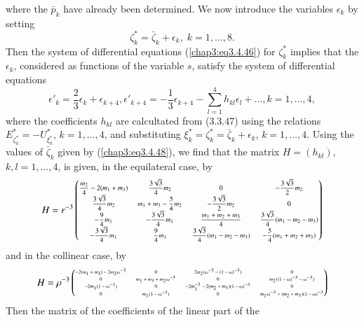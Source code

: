 where the $\bar{p}_k$ have already been determined. We now introduce
the variables $\epsilon_k$ by setting 
\begin{equation*}
\zeta^*_k = \bar{\zeta}_k + \epsilon_k, \; k =1, \ldots,
8. \tag{3.4.49}\label{chap3:eq3.4.49} 
\end{equation*}
Then the system of differential equations (\ref{chap3:eq3.4.46}) for
$\zeta^*_k$ implies that the $\epsilon_k$, considered as functions of
the variable $s$, satisfy the system of differential equations 
\begin{equation*}
\epsilon'_k = \frac{2}{3} \epsilon_k + \epsilon_{k+4} ,
\epsilon'_{k+4} = - \frac{1}{3} \epsilon_{k+4} - \sum\limits^4_{l=1}
h_{kl} \epsilon_l + \ldots, k =1 ,
\ldots,4,\tag{3.4.50}\label{chap3:eq3.4.50} 
\end{equation*} \pageoriginale
where the coefficients $h_{kl}$ are calcultated from (3.3.47) using
the relations $E^*_{\zeta^*_k} = - U^*_{\xi^*_k}$, $k =1, \ldots, 4$,
and substituting $\xi^*_k = \zeta^*_k = \bar{\zeta}_k + \epsilon_k$,
$k =1, \ldots, 4$. Using the values of $\bar{\zeta}_k$ given by
(\ref{chap3:eq3.4.48}), we find that the matrix $H = (h_{kl})$, $k, l
=1, \ldots, 4$, is given, in the equilateral case, by 
$$
{\fontsize{7}{9}\selectfont
H = r^{-3}
\begin{pmatrix}
\dfrac{m_2}{4} - 2(m_1 + m_3) & \dfrac{3\sqrt{3}}{4} m_2 & 0 &
-\dfrac{3\sqrt{3}}{2} m_2\\ 
\dfrac{3\sqrt{3}}{4} m_2 & m_1 + m_3 - \dfrac{5}{4} m_2 & -
\dfrac{3\sqrt{3}}{2}  m_2 & 0\\ 
-\dfrac{9}{4} m_1 & - \dfrac{3\sqrt{3}}{4} m_1 & \dfrac{m_1 + m_2 +
  m_3}{4} & \dfrac{3\sqrt{3}}{4} (m_1 -m_2- m_3)\\ 
-\dfrac{3\sqrt{3}}{4} m_1 & \dfrac{9}{4} m_1 & \dfrac{3\sqrt{3}}{4}
(m_1 - m_2 - m_3) & - \dfrac{5}{4} (m_1 + m_2 + m_3) 
\end{pmatrix}}
$$
and in the collinear case, by
$$ 
{\fontsize{5}{7}\selectfont
H = \rho^{-3}
\begin{pmatrix}
-2(m_1 + m_3) - 2m_2 \omega^{-3} & 0 & 2m_2 (\omega^{-3} - (1-\omega)^{-3}) & 0\\
0 & m_1 + m_3+ m_2 \omega^{-3} & 0 & m_2 ((1-\omega)^{-3} - \omega^{-3}) \\
- 2m_1(1-\omega^{-3}) & 0 & -2m_1^{-3} -2(m_2 + m_3) (1-\omega)^{-3} &  0\\
0 & m_1 (1-\omega^{-3}) & 0 & m_1 \omega^{-3} + (m_2 + m_3) (1-\omega)^{-3} 
\end{pmatrix}}
$$
Then the matrix of the coefficients of the linear part of the
